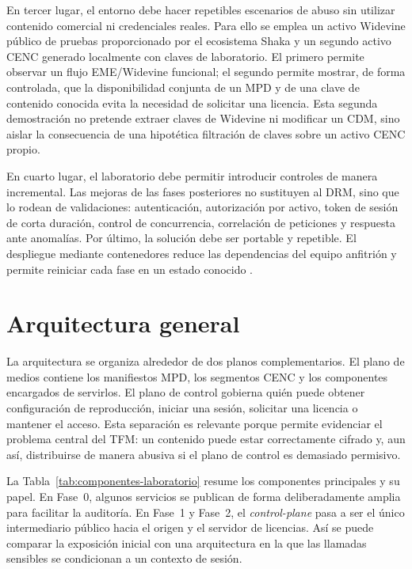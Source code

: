 En tercer lugar, el entorno debe hacer repetibles escenarios de abuso sin utilizar contenido comercial ni credenciales reales. Para ello se emplea un activo Widevine público de pruebas proporcionado por el ecosistema Shaka y un segundo activo CENC generado localmente con claves de laboratorio. El primero permite observar un flujo EME/Widevine funcional; el segundo permite mostrar, de forma controlada, que la disponibilidad conjunta de un MPD y de una clave de contenido conocida evita la necesidad de solicitar una licencia. Esta segunda demostración no pretende extraer claves de Widevine ni modificar un CDM, sino aislar la consecuencia de una hipotética filtración de claves sobre un activo CENC propio.

En cuarto lugar, el laboratorio debe permitir introducir controles de manera incremental. Las mejoras de las fases posteriores no sustituyen al DRM, sino que lo rodean de validaciones: autenticación, autorización por activo, token de sesión de corta duración, control de concurrencia, correlación de peticiones y respuesta ante anomalías. Por último, la solución debe ser portable y repetible. El despliegue mediante contenedores reduce las dependencias del equipo anfitrión y permite reiniciar cada fase en un estado conocido \cite{docker-docs2026}.

\section{Arquitectura general}

La arquitectura se organiza alrededor de dos planos complementarios. El plano de medios contiene los manifiestos MPD, los segmentos CENC y los componentes encargados de servirlos. El plano de control gobierna quién puede obtener configuración de reproducción, iniciar una sesión, solicitar una licencia o mantener el acceso. Esta separación es relevante porque permite evidenciar el problema central del TFM: un contenido puede estar correctamente cifrado y, aun así, distribuirse de manera abusiva si el plano de control es demasiado permisivo.

La Tabla~\ref{tab:componentes-laboratorio} resume los componentes principales y su papel. En Fase~0, algunos servicios se publican de forma deliberadamente amplia para facilitar la auditoría. En Fase~1 y Fase~2, el \textit{control-plane} pasa a ser el único intermediario público hacia el origen y el servidor de licencias. Así se puede comparar la exposición inicial con una arquitectura en la que las llamadas sensibles se condicionan a un contexto de sesión.


